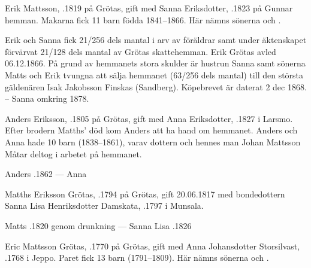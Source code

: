 %
Erik Mattsson, .1819 på Grötas, gift med Sanna Eriksdotter, .1823 på Gunnar hemman. Makarna fick 11 barn födda 1841--1866. Här nämns sönerna  och .

Erik och Sanna fick 21/256 dels mantal i arv av föräldrar samt under äktenskapet förvärvat 21/128 dels mantal av Grötas skattehemman.	Erik Grötas avled 06.12.1866. På grund av  hemmanets stora skulder är hustrun Sanna samt sönerna Matts och Erik tvungna att sälja hemmanet (63/256 dels mantal) till den största gäldenären Isak Jakobsson Finskas (Sandberg). Köpebrevet är daterat 2 dec 1868. -- Sanna \textdied omkring 1878.


%
Anders Eriksson, .1805 på Grötas, gift med Anna Eriksdotter, .1827 i Larsmo. Efter brodern Matths' död kom Anders att ha hand om hemmanet. Anders och Anna hade 10 barn (1838--1861), varav dottern  och hennes man Johan Mattsson Måtar deltog i arbetet på hemmanet.

Anders .1862  ---  Anna 


%
Matths Eriksson Grötas, .1794 på Grötas, gift 20.06.1817 med bondedottern Sanna Lisa Henriksdotter Damskata, .1797 i Munsala.
\begin{jhchildren}
  \item {}
  \item {}
  \item {}
\end{jhchildren}

Matts .1820 genom drunkning  ---  Sanna Lisa .1826


%
Eric Mattsson Grötas, .1770 på Grötas, gift med Anna Johansdotter Storsilvast, .1768 i Jeppo. Paret fick 13 barn (1791--1809). Här nämns sönerna  och .

